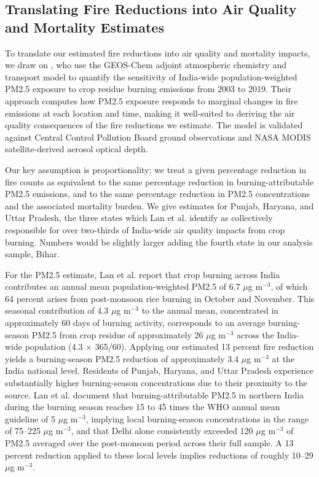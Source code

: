 \documentclass[12pt]{article}
\begin{document}
\newpage
\subsection{Translating Fire Reductions into Air Quality and Mortality Estimates}\label{sec:mortality_estimates}

To translate our estimated fire reductions into air quality and mortality impacts, we draw on \citet{lan2022air}, who use the GEOS-Chem adjoint atmospheric chemistry and transport model to quantify the sensitivity of India-wide population-weighted PM2.5 exposure to crop residue burning emissions from 2003 to 2019. Their approach computes how PM2.5 exposure responds to marginal changes in fire emissions at each location and time, making it well-suited to deriving the air quality consequences of the fire reductions we estimate. The model is validated against Central Control Pollution Board ground observations and NASA MODIS satellite-derived aerosol optical depth. 

Our key assumption is proportionality: we treat a given percentage reduction in fire counts as equivalent to the same percentage reduction in burning-attributable PM2.5 emissions, and to the same percentage reduction in PM2.5 concentrations and the associated mortality burden. We give estimates for Punjab, Haryana, and Uttar Pradesh, the three states which Lan et al. identify as collectively responsible for over two-thirds of India-wide air quality impacts from crop burning. Numbers would be slightly larger adding the fourth state in our analysis sample, Bihar.

For the PM2.5 estimate, Lan et al. report that crop burning across India contributes an annual mean population-weighted PM2.5 of 6.7 $\mu$g m$^{-3}$, of which 64 percent arises from post-monsoon rice burning in October and November. This seasonal contribution of 4.3 $\mu$g m$^{-3}$ to the annual mean, concentrated in approximately 60 days of burning activity, corresponds to an average burning-season PM2.5 from crop residue of approximately 26 $\mu$g m$^{-3}$ across the India-wide population (4.3 × 365/60). Applying our estimated 13 percent fire reduction yields a burning-season PM2.5 reduction of approximately 3.4 $\mu$g m$^{-3}$ at the India national level. Residents of Punjab, Haryana, and Uttar Pradesh experience substantially higher burning-season concentrations due to their proximity to the source. Lan et al. document that burning-attributable PM2.5 in northern India during the burning season reaches 15 to 45 times the WHO annual mean guideline of 5 $\mu$g m$^{-3}$, implying local burning-season concentrations in the range of 75–225 $\mu$g m$^{-3}$, and that Delhi alone consistently exceeded 120 $\mu$g m$^{-3}$ of PM2.5 averaged over the post-monsoon period across their full sample. A 13 percent reduction applied to these local levels implies reductions of roughly 10–29 $\mu$g m$^{-3}$. 
\end{document}

